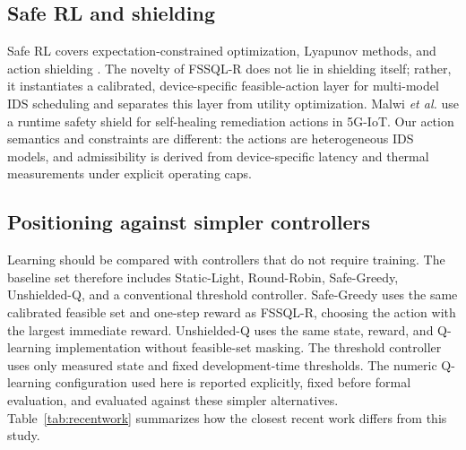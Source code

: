\documentclass[journal]{IEEEtran}
\begin{document}
\subsection{Safe RL and shielding}
Safe RL covers expectation-constrained optimization, Lyapunov methods, and action shielding \cite{garcia2015safesurvey,achiam2017cpo,chow2018lyapunov,alshiekh2018shielding}. The novelty of FSSQL-R does not lie in shielding itself; rather, it instantiates a calibrated, device-specific feasible-action layer for multi-model IDS scheduling and separates this layer from utility optimization. Malwi \emph{et al.} \cite{malwi2026safetyaware} use a runtime safety shield for self-healing remediation actions in 5G-IoT. Our action semantics and constraints are different: the actions are heterogeneous IDS models, and admissibility is derived from device-specific latency and thermal measurements under explicit operating caps.

\subsection{Positioning against simpler controllers}
Learning should be compared with controllers that do not require training. The baseline set therefore includes Static-Light, Round-Robin, Safe-Greedy, Unshielded-Q, and a conventional threshold controller. Safe-Greedy uses the same calibrated feasible set and one-step reward as FSSQL-R, choosing the action with the largest immediate reward. Unshielded-Q uses the same state, reward, and Q-learning implementation without feasible-set masking. The threshold controller uses only measured state and fixed development-time thresholds. The numeric Q-learning configuration used here is reported explicitly, fixed before formal evaluation, and evaluated against these simpler alternatives. Table~\ref{tab:recentwork} summarizes how the closest recent work differs from this study.
\end{document}
